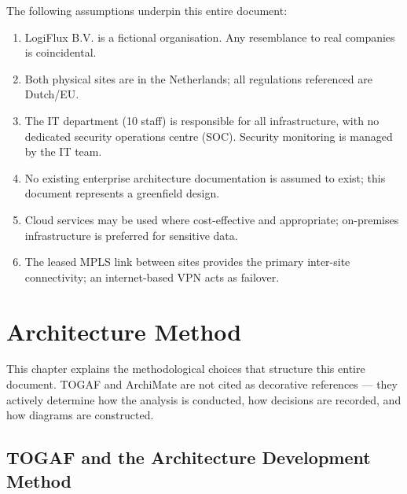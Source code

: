 The following assumptions underpin this entire document:

\begin{enumerate}
    \item LogiFlux B.V. is a fictional organisation. Any resemblance to real companies is coincidental.
    \item Both physical sites are in the Netherlands; all regulations referenced are Dutch/EU.
    \item The IT department (10 staff) is responsible for all infrastructure, with no dedicated security operations centre (SOC). Security monitoring is managed by the IT team.
    \item No existing enterprise architecture documentation is assumed to exist; this document represents a greenfield design.
    \item Cloud services may be used where cost-effective and appropriate; on-premises infrastructure is preferred for sensitive data.
    \item The leased MPLS link between sites provides the primary inter-site connectivity; an internet-based VPN acts as failover.
\end{enumerate}

\chapter{Architecture Method}
\label{chapter:architecture-method}

This chapter explains the methodological choices that structure this entire document. TOGAF and ArchiMate are not cited as decorative references --- they actively determine how the analysis is conducted, how decisions are recorded, and how diagrams are constructed.

\section{TOGAF and the Architecture Development Method}

